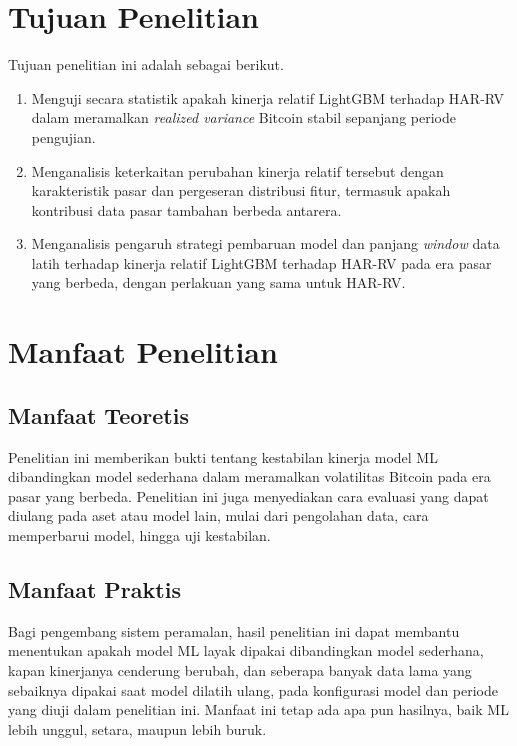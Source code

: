 \section{Tujuan Penelitian}
Tujuan penelitian ini adalah sebagai berikut.
\begin{enumerate}
  \item Menguji secara statistik apakah kinerja relatif LightGBM terhadap
        HAR-RV dalam meramalkan \textit{realized variance} Bitcoin stabil
        sepanjang periode pengujian.
  \item Menganalisis keterkaitan perubahan kinerja relatif tersebut dengan
        karakteristik pasar dan pergeseran distribusi fitur, termasuk apakah
        kontribusi data pasar tambahan berbeda antarera.
  \item Menganalisis pengaruh strategi pembaruan model dan panjang
        \textit{window} data latih terhadap kinerja relatif LightGBM
        terhadap HAR-RV pada era pasar yang berbeda, dengan perlakuan yang
        sama untuk HAR-RV.
\end{enumerate}

\section{Manfaat Penelitian}

\subsection{Manfaat Teoretis}
Penelitian ini memberikan bukti tentang kestabilan kinerja model ML
dibandingkan model sederhana dalam meramalkan volatilitas Bitcoin pada era
pasar yang berbeda. Penelitian ini juga menyediakan cara evaluasi yang dapat
diulang pada aset atau model lain, mulai dari pengolahan data, cara
memperbarui model, hingga uji kestabilan.

\subsection{Manfaat Praktis}
Bagi pengembang sistem peramalan, hasil penelitian ini dapat membantu
menentukan apakah model ML layak dipakai dibandingkan model sederhana, kapan
kinerjanya cenderung berubah, dan seberapa banyak data lama yang sebaiknya
dipakai saat model dilatih ulang, pada konfigurasi model dan periode yang
diuji dalam penelitian ini. Manfaat ini tetap ada apa pun hasilnya,
baik ML lebih unggul, setara, maupun lebih buruk.

